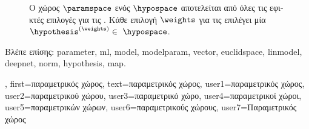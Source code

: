 {{\begin{figure}[H]
\begin{center}
			\end{center} 
			{
			\caption{\foreignlanguage{greek}{Ο}  \foreignlanguage{greek}{χώρος} $\paramspace$ 
				\foreignlanguage{greek}{ενός}   $\hypospace$ \foreignlanguage{greek}{αποτελείται 
				από όλες τις εφικτές επιλογές για τις} . \foreignlanguage{greek}{Κάθε επιλογή $\weights$ για τις} 
				 \foreignlanguage{greek}{επιλέγει μία}   
				$\hypothesis^{(\weights)} \in \hypospace$.
				 \label{fig_param_space_dict}} }
			\end{figure}
			\foreignlanguage{greek}{Βλέπε επίσης:} \gls{parameter}, \gls{ml}, \gls{model}, \gls{modelparam}, \gls{vector}, \gls{euclidspace}, 
			\gls{linmodel}, \gls{deepnet}, \gls{norm}, \gls{hypothesis}, \gls{map}.},
		first={\foreignlanguage{greek}{παραμετρικός χώρος}},
		text={\foreignlanguage{greek}{παραμετρικός χώρος}},
		user1={\foreignlanguage{greek}{παραμετρικός χώρος}}, %
		user2={\foreignlanguage{greek}{παραμετρικού χώρου}}, %
		user3={\foreignlanguage{greek}{παραμετρικό χώρο}}, %
		user4={\foreignlanguage{greek}{παραμετρικοί χώροι}}, %
		user5={\foreignlanguage{greek}{παραμετρικών χώρων}}, %
		user6={\foreignlanguage{greek}{παραμετρικούς χώρους}}, %
		user7={\foreignlanguage{greek}{Παραμετρικός χώρος}} %
}%

